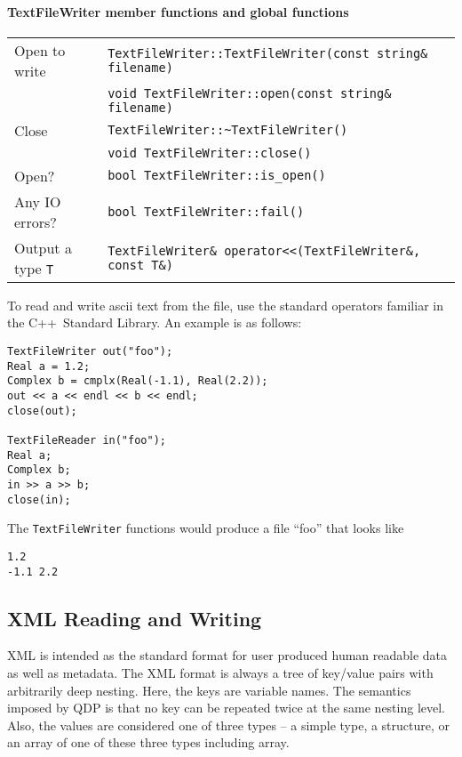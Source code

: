 \documentclass[12pt,letterpaper]{article}
\newcommand{\cpp}{C++}
\begin{document}
\paragraph{TextFileWriter member functions and global functions}

\begin{flushleft}
  \begin{tabular}{|l|l|}
  \hline
  Open to write  & \verb|TextFileWriter::TextFileWriter(const string& filename)|\\
                 & \verb|void TextFileWriter::open(const string& filename)|\\
  \hline
  Close          & \verb|TextFileWriter::~TextFileWriter()|\\
                 & \verb|void TextFileWriter::close()|\\
  \hline
  Open?          & \verb|bool TextFileWriter::is_open()| \\
  \hline
  Any IO errors? & \verb|bool TextFileWriter::fail()| \\
  \hline
  Output a type \verb|T| & \verb|TextFileWriter& operator<<(TextFileWriter&, const T&)| \\
  \hline
 \end{tabular}
\end{flushleft}
%
To read and write ascii text from the file, use the standard operators
familiar in the \cpp\ Standard Library. An example is as follows:
%
\begin{small}
\begin{verbatim}
TextFileWriter out("foo");
Real a = 1.2;
Complex b = cmplx(Real(-1.1), Real(2.2));
out << a << endl << b << endl;
close(out);

TextFileReader in("foo");
Real a;
Complex b;
in >> a >> b;
close(in);
\end{verbatim}
\end{small}
%
The \verb|TextFileWriter| functions would produce a file ``foo'' that looks
like
\begin{verbatim}
1.2
-1.1 2.2
\end{verbatim}

\subsection{XML Reading and Writing}
\label{sec:xmlio}

XML is intended as the standard format for user produced human
readable data as well as metadata. The XML format is always a tree of
key/value pairs with arbitrarily deep nesting. Here, the keys are
variable names. The semantics imposed by QDP is that no key can be
repeated twice at the same nesting level. Also, the values are considered
one of three types -- a simple type, a structure, or an array of one of these
three types including array.
\end{document}
